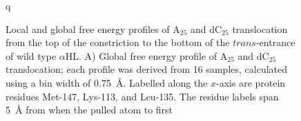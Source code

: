 \documentclass[a4paper,10pt]{article}
\newcommand{\dctf}{dC$_{25}$ }
\newcommand{\atf}{A$_{25}$ }
\newcommand{\ahl}{$\alpha$HL }
\newcommand{\ahlnsp}{$\alpha$HL}
\begin{document}
 \begin{figure}[!h]
  \begin{center}
    \end{center}
q    \caption[Local and global free energy profiles of \atf and \dctf translocation from the top of the constriction to the bottom of the $trans$-entrance of wild type \ahl]{Local and global free energy profiles of \atf and \dctf translocation from the top of the constriction to the bottom of the $trans$-entrance of wild type \ahlnsp. A) Global free energy profile of \atf and \dctf
translocation; each profile was derived from 16 samples, calculated using a bin width of 0.75~{\AA}. Labelled along the $x$-axis are protein residues Met-147, Lys-113, and Leu-135. The residue labels span 5~{\AA} from when the pulled atom to first
}
\end{figure}
\end{document}
